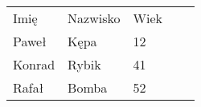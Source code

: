 \begin{table}[h]
\begin{tabular}{|l|l|l|ll}
\cline{1-3}
Imię   & Nazwisko & Wiek &  &  \\ \cline{1-3}
Paweł  & Kępa     & 12   &  &  \\ \cline{1-3}
Konrad & Rybik    & 41   &  &  \\ \cline{1-3}
Rafał  & Bomba    & 52   &  &  \\ \cline{1-3}
\end{tabular}
\end{table}